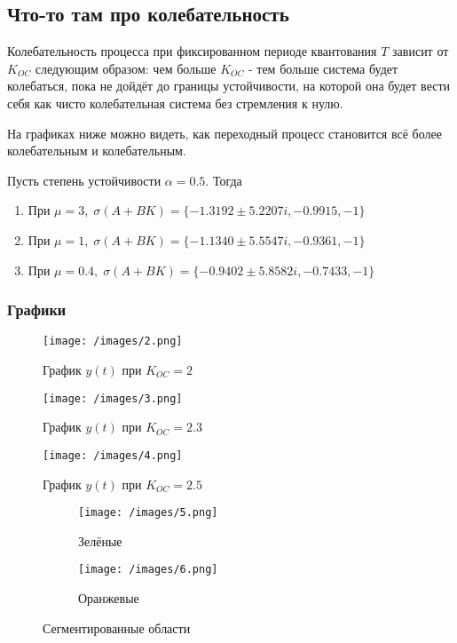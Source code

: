 \subsection{Что-то там про колебательность}

Колебательность процесса при фиксированном периоде квантования $T$ зависит от $K_{OC}$ следующим образом: чем больше $K_{OC}$ - тем больше система будет колебаться, пока не дойдёт до границы устойчивости, на которой она будет вести себя как чисто колебательная система без стремления к нулю.

На графиках ниже можно видеть, как переходный процесс становится всё более колебательным и колебательным. 

Пусть степень устойчивости $\alpha = 0.5$. Тогда

\begin{enumerate}
    \item При $\mu = 3, \; \sigma(A+BK) = \{  -1.3192 \pm 5.2207i,  -0.9915, -1\}$
    \item При $\mu = 1, \; \sigma(A+BK) = \{  -1.1340 \pm 5.5547i,  -0.9361, -1\}$
    \item При $\mu = 0.4, \; \sigma(A+BK) = \{  -0.9402 \pm 5.8582i,  -0.7433, -1\}$
\end{enumerate}


\subsubsection{Графики}

\begin{figure}[H]
    \centering
\texttt{[image: /images/2.png]}
    \caption{График $y(t)$ при $K_{OC} = 2$}
    \label{fig:p2}
\end{figure}


\begin{figure}[H]
    \centering
\texttt{[image: /images/3.png]}
    \caption{График $y(t)$ при $K_{OC} = 2.3$}
    \label{fig:p3}
\end{figure}


\begin{figure}[H]
    \centering
\texttt{[image: /images/4.png]}
    \caption{График $y(t)$ при $K_{OC} = 2.5$}
    \label{fig:p4}
\end{figure}

\begin{figure}[!htbp]
\centering
\begin{subfigure}{.5\textwidth}
  \centering
  \texttt{[image: /images/5.png]}
  \caption{Зелёные}
  \label{fig:sub1}
\end{subfigure}%
\begin{subfigure}{.5\textwidth}
  \centering
  \texttt{[image: /images/6.png]}
  \caption{Оранжевые}
  \label{fig:sub2}
\end{subfigure}
\label{fig:test}
\caption{Сегментированные области}
\end{figure}

